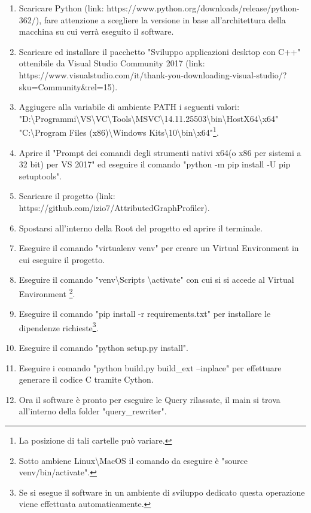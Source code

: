 \begin{enumerate}
\item Scaricare Python (link: https://www.python.org/downloads/release/python-362/), fare attenzione a scegliere la versione in base all'architettura della macchina su cui verrà eseguito il software.
\item Scaricare ed installare il pacchetto "Sviluppo applicazioni desktop con C++" ottenibile da Visual Studio Community 2017 (link: https://www.visualstudio.com/it/thank-you-downloading-visual-studio/?sku=Community\&rel=15).
\item Aggiugere alla variabile di ambiente PATH i seguenti valori:\\ "D:\textbackslash Programmi\textbackslash VS\textbackslash VC\textbackslash Tools\textbackslash MSVC\textbackslash 14.11.25503\textbackslash bin\textbackslash HostX64\textbackslash x64"\\
"C:\textbackslash Program Files (x86)\textbackslash Windows Kits\textbackslash 10\textbackslash bin\textbackslash x64"\footnote{La posizione di tali cartelle può variare.}.
\item Aprire il "Prompt dei comandi degli strumenti nativi x64(o x86 per sistemi a 32 bit) per VS 2017" ed eseguire il comando "python -m pip install -U pip setuptools".
\item Scaricare il progetto (link: https://github.com/izio7/AttributedGraphProfiler).
\item Spostarsi all'interno della Root del progetto ed aprire il terminale.
\item Eseguire il comando "virtualenv venv" per creare un Virtual Environment in cui eseguire il progetto.
\item Eseguire il comando "venv\textbackslash Scripts \textbackslash activate" con cui si si accede al Virtual Environment \footnote{Sotto ambiene Linux\textbackslash MacOS il comando da eseguire è "source venv/bin/activate".}.
\item Eseguire il comando "pip install -r requirements.txt" per installare le dipendenze richieste\footnote{Se si esegue il software in un ambiente di sviluppo dedicato questa operazione viene effettuata automaticamente.}.
\item Eseguire il comando "python setup.py install".
\item Eseguire i comando "python build.py build{\_}ext --inplace" per effettuare generare il codice C tramite Cython.
\item Ora il software è pronto per eseguire le Query rilassate, il main si trova all'interno della folder "query{\_}rewriter".
\end{enumerate}

